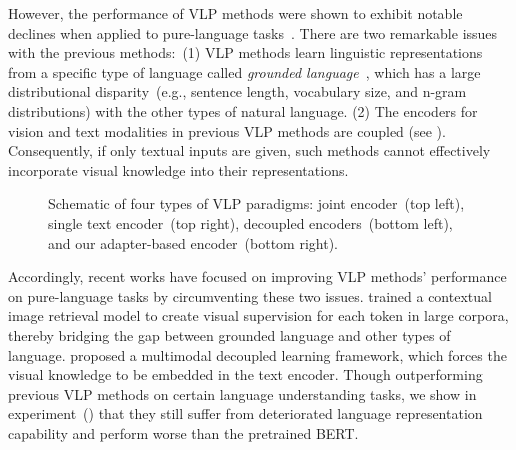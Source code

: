 However, the performance of VLP methods were shown to exhibit notable declines when applied to pure-language tasks~\citep{voken}. There are two remarkable issues with
the previous methods:~(1) VLP methods learn linguistic representations from a specific type of language called \textit{grounded language}~\citep{groundedL1,groundedL2}, which has a large distributional disparity~(e.g., sentence length, vocabulary size, and n-gram distributions) with the other types of natural language. 
(2) The encoders for vision and text modalities in previous VLP methods are coupled 
(see ). 
Consequently, if only textual inputs are given, such methods cannot effectively 
incorporate visual knowledge into their representations.
\begin{figure}[t]
	\centering
	\caption{Schematic of four types of VLP paradigms: joint encoder~(top left), single text encoder~(top right), decoupled encoders~(bottom left), and our adapter-based encoder~(bottom right).} \label{fig:intro}
\end{figure} 
Accordingly, recent works have focused on improving VLP methods' performance on pure-language tasks by circumventing these two issues. \citet{voken} trained a contextual image retrieval model to create visual supervision for each token in large corpora, thereby bridging the gap between grounded language and other types of language. \citet{macd} proposed a multimodal decoupled learning framework, which forces the visual knowledge to be embedded in the text encoder. Though outperforming previous VLP methods on certain language understanding tasks, we show in experiment~() that they still suffer from deteriorated language representation capability and perform worse than the pretrained BERT.
